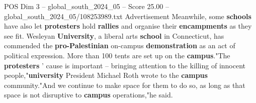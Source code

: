 \begin{textsample}{POS Dim 3 – global\_south\_2024\_05 – Score 25.00 – global\_south\_2024\_05/108253989.txt}
Advertisement Meanwhile, some \textbf{schools} have also let \textbf{protesters} hold \textbf{rallies} and organise their \textbf{encampments} as they see fit.
Wesleyan \textbf{University}, a liberal arts \textbf{school} in Connecticut, has commended the \textbf{pro-Palestinian} on-campus \textbf{demonstration} as an act of political expression.
More than 100 tents are set up on the \textbf{campus}."The \textbf{protesters} ' cause is important -- bringing attention to the killing of innocent people,"\textbf{university} President Michael Roth wrote to the \textbf{campus} community."And we continue to make space for them to do so, as long as that space is not disruptive to \textbf{campus} operations,"he said.

\end{textsample}
